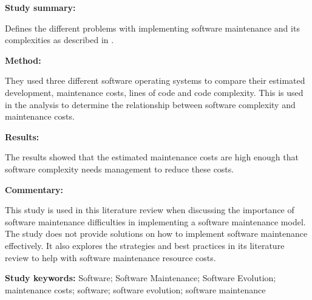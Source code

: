 \begin{tcolorbox}[colback=gray!5!white, colframe=pastelgreen!40!black, title=On the Relationship between Software Complexity and Maintenance Costs\cite{Ogheneovo2014}]
	\begin{minipage}[t]{0.25\textwidth}
		\textbf{Study summary:}
	\end{minipage}
	\hfill
	\begin{minipage}[t]{0.65\textwidth}
		Defines the different problems with implementing software maintenance and its complexities
		as described in . 
	\end{minipage}

	\vspace{0.75em} 

	\begin{minipage}[t]{0.25\textwidth}
		\textbf{Method:}
	\end{minipage}
	\hfill
	\begin{minipage}[t]{0.65\textwidth}
		They used three different software operating systems to compare their estimated development, maintenance costs, lines of code and code complexity. This is used in the analysis to determine the relationship between software complexity and maintenance costs.
	\end{minipage}

	\vspace{0.75em} 

	\begin{minipage}[t]{0.25\textwidth}
		\textbf{Results:}
	\end{minipage}
	\hfill
	\begin{minipage}[t]{0.65\textwidth}
		The results showed that the estimated maintenance costs are high enough that software complexity needs management to reduce these costs.
	\end{minipage}

	\vspace{0.75em} 

	\begin{minipage}[t]{0.25\textwidth}
		\textbf{Commentary:}
	\end{minipage}
	\hfill
	\begin{minipage}[t]{0.65\textwidth}
		This study is used in this literature review when discussing the importance of software
		maintenance difficulties in implementing a software maintenance model. The study does not
		provide solutions on how to implement software maintenance effectively. It also explores the strategies and best
		practices in its literature review to help with software maintenance resource costs.
	\end{minipage}
	\tcblower
	\textbf{Study keywords:} Software; Software Maintenance; Software Evolution; maintenance costs;
	software; software evolution; software maintenance
\end{tcolorbox}

